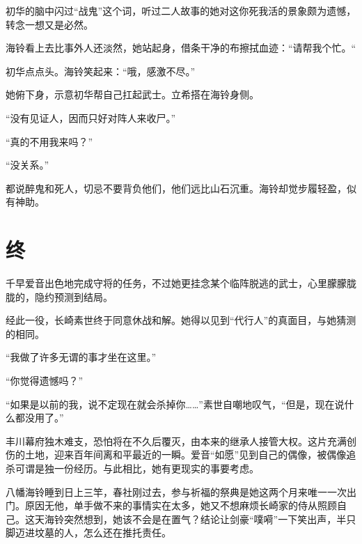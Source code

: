 \documentclass{article}
\begin{document}
初华的脑中闪过“战鬼”这个词，听过二人故事的她对这你死我活的景象颇为遗憾，转念一想又是必然。



海铃看上去比事外人还淡然，她站起身，借条干净的布擦拭血迹：“请帮我个忙。“



初华点点头。海铃笑起来：“哦，感激不尽。”



她俯下身，示意初华帮自己扛起武士。立希搭在海铃身侧。



“没有见证人，因而只好对阵人来收尸。”



“真的不用我来吗？”



“没关系。”



都说醉鬼和死人，切忌不要背负他们，他们远比山石沉重。海铃却觉步履轻盈，似有神助。





{\centering\section*{终 }}





千早爱音出色地完成守将的任务，不过她更挂念某个临阵脱逃的武士，心里朦朦胧胧的，隐约预测到结局。



经此一役，长崎素世终于同意休战和解。她得以见到“代行人”的真面目，与她猜测的相同。



“我做了许多无谓的事才坐在这里。”



“你觉得遗憾吗？”



“如果是以前的我，说不定现在就会杀掉你……”素世自嘲地叹气，“但是，现在说什么都没用了。”



丰川幕府独木难支，恐怕将在不久后覆灭，由本来的继承人接管大权。这片充满创伤的土地，迎来百年间离和平最近的一瞬。爱音“如愿”见到自己的偶像，被偶像追杀可谓是独一份经历。与此相比，她有更现实的事要考虑。



八幡海铃睡到日上三竿，春社刚过去，参与祈福的祭典是她这两个月来唯一一次出门。原因无他，单手做不来的事情实在太多，她又不想麻烦长崎家的侍从照顾自己。这天海铃突然想到，她该不会是在置气？结论让剑豪“噗嗬”一下笑出声，半只脚迈进坟墓的人，怎么还在推托责任。
\end{document}
